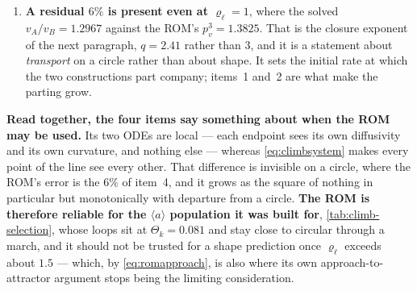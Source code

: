 \documentclass{article}
\newcommand{\aloop}{\ensuremath{\langle a\rangle}}
\begin{document}
\begin{enumerate}
\begin{center}
\begin{tabular}{@{}r rrr@{}}
      \midrule
      $0.82$ & $1.0491$ & $1.0534$ & $1.004$\\
      $0.65$ & $1.1113$ & $1.1332$ & $1.020$\\
      $0.47$ & $1.2022$ & $1.2575$ & $1.046$\\
      $0.30$ & $1.3468$ & $1.4613$ & $\mathbf{1.085}$\\
      \bottomrule
      \end{tabular}
      \end{center}
      so the capillary shape feedback is worth $8.5\%$ in $\varrho_\ell$ at the
      end of the anneal --- \textbf{when the whole of the ROM's excess is
      $37\%$}. Removing it \emph{entirely} could account for at most a quarter of
      the gap, and the ROM does not remove it entirely; it carries it at two
      points. Capillary resolution is therefore a real but third-order
      contribution, and the geometric term of item~1 is the explanation.
\item \textbf{A residual $6\%$ is present even at $\varrho_\ell=1$}, where the
      solved $v_A/v_B=1.2967$ against the ROM's $p_v^3=1.3825$. That is the
      closure exponent of the next paragraph, $q=2.41$ rather than $3$, and it is
      a statement about \emph{transport} on a circle rather than about shape. It
      sets the initial rate at which the two constructions part company; items~1
      and~2 are what make the parting grow.
\end{enumerate}

\textbf{Read together, the four items say something about when the ROM may be
used.} Its two ODEs are local --- each endpoint sees its own diffusivity and its
own curvature, and nothing else --- whereas \cref{eq:climbsystem} makes every
point of the line see every other. That difference is invisible on a circle,
where the ROM's error is the $6\%$ of item~4, and it grows as the square of
nothing in particular but monotonically with departure from a circle. \textbf{The
ROM is therefore reliable for the \aloop{} population it was built for},
\cref{tab:climb-selection}, whose loops sit at $\Theta_k=0.081$ and stay close to
circular through a march, and it should not be trusted for a shape prediction
once $\varrho_\ell$ exceeds about $1.5$ --- which, by \cref{eq:romapproach}, is
also where its own approach-to-attractor argument stops being the limiting
consideration.
\end{document}
